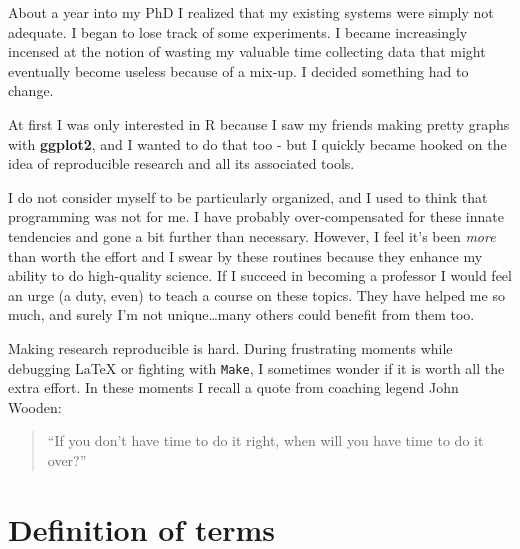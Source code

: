 \documentclass[
  letterpaper,
  openany]{book}
\renewenvironment{leftbar}{\def\FrameCommand{\color{grey30}\vrule width 1pt \hspace{10pt}}\MakeFramed {\advance\hsize-\width \FrameRestore}}{\endMakeFramed}
\renewenvironment{quote}%
{\begin{leftbar} \begin{quotation} \noindent \small }%
{\end{quotation}\end{leftbar}}
\begin{document}
About a year into my PhD I realized that my existing systems were simply not adequate.
I began to lose track of some experiments.
I became increasingly incensed at the notion of wasting my valuable time collecting data that might eventually become useless because of a mix-up.
I decided something had to change.

At first I was only interested in R because I saw my friends making pretty graphs with \textbf{ggplot2}, and I wanted to do that too - but I quickly became hooked on the idea of reproducible research and all its associated tools.

I do not consider myself to be particularly organized, and I used to think that programming was not for me.
I have probably over-compensated for these innate tendencies and gone a bit further than necessary.
However, I feel it's been \emph{more} than worth the effort and I swear by these routines because they enhance my ability to do high-quality science.
If I succeed in becoming a professor I would feel an urge (a duty, even) to teach a course on these topics.
They have helped me so much, and surely I'm not unique\ldots many others could benefit from them too.

Making research reproducible is hard.
During frustrating moments while debugging \LaTeX{} or fighting with \texttt{Make}, I sometimes wonder if it is worth all the extra effort.
In these moments I recall a quote from coaching legend John Wooden:

\begin{quote}
``If you don't have time to do it right, when will you have time to do it over?''
\end{quote}

\hypertarget{definition-of-terms}{%
\chapter{Definition of terms}\label{definition-of-terms}}
\end{document}
